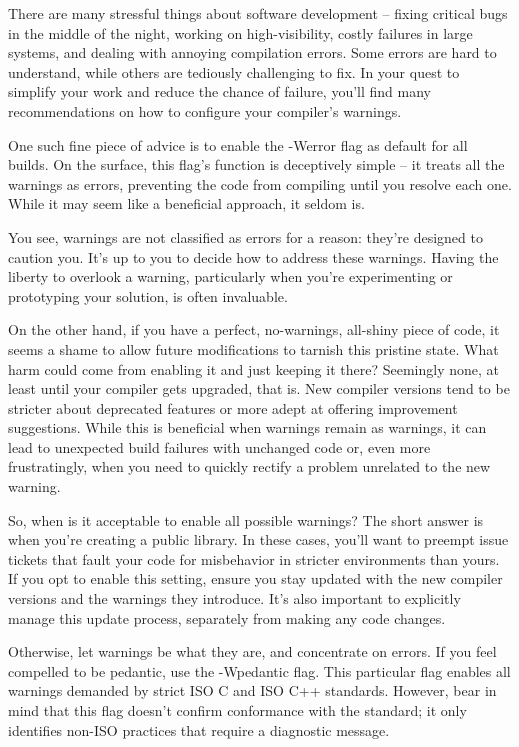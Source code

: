 
There are many stressful things about software development – fixing critical bugs in the middle of the night, working on high-visibility, costly failures in large systems, and dealing with annoying compilation errors. Some errors are hard to understand, while others are tediously challenging to fix. In your quest to simplify your work and reduce the chance of failure, you’ll find many recommendations on how to configure your compiler’s warnings.

One such fine piece of advice is to enable the -Werror flag as default for all builds. On the surface, this flag’s function is deceptively simple – it treats all the warnings as errors, preventing the code from compiling until you resolve each one. While it may seem like a beneficial approach, it seldom is.

You see, warnings are not classified as errors for a reason: they’re designed to caution you. It’s up to you to decide how to address these warnings. Having the liberty to overlook a warning, particularly when you’re experimenting or prototyping your solution, is often invaluable.

On the other hand, if you have a perfect, no-warnings, all-shiny piece of code, it seems a shame to allow future modifications to tarnish this pristine state. What harm could come from enabling it and just keeping it there? Seemingly none, at least until your compiler gets upgraded, that is. New compiler versions tend to be stricter about deprecated features or more adept at offering improvement suggestions. While this is beneficial when warnings remain as warnings, it can lead to unexpected build failures with unchanged code or, even more frustratingly, when you need to quickly rectify a problem unrelated to the new warning.

So, when is it acceptable to enable all possible warnings? The short answer is when you’re creating a public library. In these cases, you’ll want to preempt issue tickets that fault your code for misbehavior in stricter environments than yours. If you opt to enable this setting, ensure you stay updated with the new compiler versions and the warnings they introduce. It’s also important to explicitly manage this update process, separately from making any code changes.

Otherwise, let warnings be what they are, and concentrate on errors. If you feel compelled to be pedantic, use the -Wpedantic flag. This particular flag enables all warnings demanded by strict ISO C and ISO C++ standards. However, bear in mind that this flag doesn’t confirm conformance with the standard; it only identifies non-ISO practices that require a diagnostic message.

